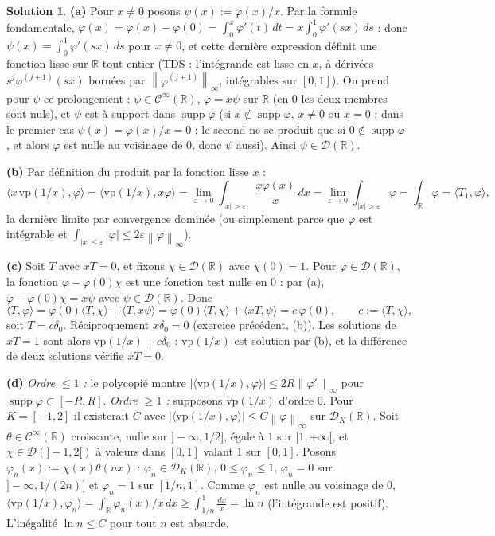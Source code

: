 \documentclass[11pt,a4paper]{article}
\newcommand{\R}{\mathbb{R}}
\newcommand{\norm}[1]{\left\|#1\right\|}
\newcommand{\Cinf}{\mathcal{C}^\infty}
\DeclareMathOperator{\supp}{supp}
\newcommand{\D}{\mathcal{D}}
\theoremstyle{definition}
\newtheorem*{solution}{Solution}
\begin{document}
\begin{solution}
\noindent\textbf{(a)} Pour $x\ne0$ posons $\psi(x):=\varphi(x)/x$. Par la formule fondamentale, $\varphi(x)=\varphi(x)-\varphi(0)=\int_0^x\varphi'(t)\,dt=x\int_0^1\varphi'(sx)\,ds$ : donc $\psi(x)=\int_0^1\varphi'(sx)\,ds$ pour $x\ne0$, et cette dernière expression définit une fonction lisse sur $\R$ tout entier (TDS : l'intégrande est lisse en $x$, à dérivées $s^j\varphi^{(j+1)}(sx)$ bornées par $\norm{\varphi^{(j+1)}}_\infty$, intégrables sur $[0,1]$). On prend pour $\psi$ ce prolongement : $\psi\in\Cinf(\R)$, $\varphi=x\psi$ sur $\R$ (en $0$ les deux membres sont nuls), et $\psi$ est à support dans $\supp\varphi$ (si $x\notin\supp\varphi$, $x\ne0$ ou $x=0$ ; dans le premier cas $\psi(x)=\varphi(x)/x=0$ ; le second ne se produit que si $0\notin\supp\varphi$, et alors $\varphi$ est nulle au voisinage de $0$, donc $\psi$ aussi). Ainsi $\psi\in\D(\R)$.

\medskip
\noindent\textbf{(b)} Par définition du produit par la fonction lisse $x$ :
\[
\langle x\,\mathrm{vp}(1/x),\varphi\rangle=\langle\mathrm{vp}(1/x),x\varphi\rangle=\lim_{\varepsilon\to0}\int_{|x|>\varepsilon}\frac{x\varphi(x)}x\,dx=\lim_{\varepsilon\to0}\int_{|x|>\varepsilon}\varphi=\int_\R\varphi=\langle T_1,\varphi\rangle,
\]
la dernière limite par convergence dominée (ou simplement parce que $\varphi$ est intégrable et $\int_{|x|\le\varepsilon}|\varphi|\le2\varepsilon\norm\varphi_\infty$).

\medskip
\noindent\textbf{(c)} Soit $T$ avec $xT=0$, et fixons $\chi\in\D(\R)$ avec $\chi(0)=1$. Pour $\varphi\in\D(\R)$, la fonction $\varphi-\varphi(0)\chi$ est une fonction test nulle en $0$ : par (a), $\varphi-\varphi(0)\chi=x\psi$ avec $\psi\in\D(\R)$. Donc
\[
\langle T,\varphi\rangle=\varphi(0)\langle T,\chi\rangle+\langle T,x\psi\rangle=\varphi(0)\langle T,\chi\rangle+\langle xT,\psi\rangle=c\,\varphi(0),\qquad c:=\langle T,\chi\rangle,
\]
soit $T=c\delta_0$. Réciproquement $x\delta_0=0$ (exercice précédent, (b)). Les solutions de $xT=1$ sont alors $\mathrm{vp}(1/x)+c\delta_0$ : $\mathrm{vp}(1/x)$ est solution par (b), et la différence de deux solutions vérifie $xT=0$.

\medskip
\noindent\textbf{(d)} \emph{Ordre $\le1$ :} le polycopié montre $|\langle\mathrm{vp}(1/x),\varphi\rangle|\le2R\norm{\varphi'}_\infty$ pour $\supp\varphi\subset[-R,R]$. \emph{Ordre $\ge1$ :} supposons $\mathrm{vp}(1/x)$ d'ordre $0$. Pour $K=[-1,2]$ il existerait $C$ avec $|\langle\mathrm{vp}(1/x),\varphi\rangle|\le C\norm\varphi_\infty$ sur $\D_K(\R)$. Soit $\theta\in\Cinf(\R)$ croissante, nulle sur $]-\infty,1/2]$, égale à $1$ sur $[1,+\infty[$, et $\chi\in\D(]-1,2[)$ à valeurs dans $[0,1]$ valant $1$ sur $[0,1]$. Posons $\varphi_n(x):=\chi(x)\theta(nx)$ : $\varphi_n\in\D_K(\R)$, $0\le\varphi_n\le1$, $\varphi_n=0$ sur $]-\infty,1/(2n)]$ et $\varphi_n=1$ sur $[1/n,1]$. Comme $\varphi_n$ est nulle au voisinage de $0$, $\langle\mathrm{vp}(1/x),\varphi_n\rangle=\int_\R\varphi_n(x)/x\,dx\ge\int_{1/n}^1\frac{dx}x=\ln n$ (l'intégrande est positif). L'inégalité $\ln n\le C$ pour tout $n$ est absurde.


\end{solution}
\end{document}

